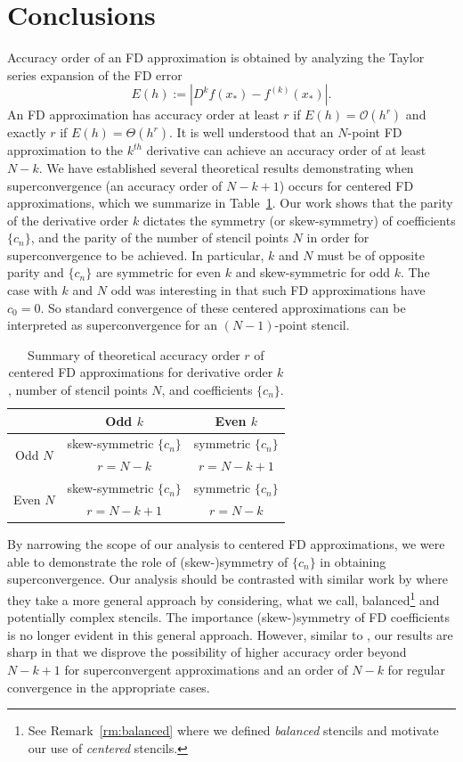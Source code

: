 \documentclass[12pt]{article}
\newcommand{\xstar}{x_*}
\newcommand{\FD}{D}
\begin{document}
\section{Conclusions}
\label{sec:conclusions}

Accuracy order of an FD approximation is obtained by analyzing the Taylor series expansion of the FD error
\[
	E(h) := \left| \FD^{k}f(\xstar) - f^{(k)}(\xstar)\right|.
\]
An FD approximation has accuracy order at least $r$ if $E(h)=\mathcal O(h^r)$ and exactly $r$ if $E(h)=\Theta(h^r)$.
It is well understood that an $N$-point FD approximation to the $k^{th}$ derivative can achieve an accuracy order of at least $N-k$.
We have established several theoretical results demonstrating when superconvergence (an accuracy order of $N-k+1$) occurs for centered FD approximations, which we summarize in Table~\ref{table:theory}.
Our work shows that the parity of the derivative order $k$ dictates the symmetry (or skew-symmetry) of coefficients $\{c_n\}$, and the parity of the number of stencil points $N$ in order for superconvergence to be achieved.
In particular, $k$ and $N$ must be of opposite parity and $\{c_n\}$ are symmetric for even $k$ and skew-symmetric for odd $k$.
The case with $k$ and $N$ odd was interesting in that such FD approximations have $c_0=0$.
So standard convergence of these centered approximations can be interpreted as superconvergence for an $(N-1)$-point stencil.

%
\begin{table}[h!]
\centering
\begin{tabular}{c|| c | c }
	& Odd $k$ & Even $k$ \\ \hline \hline
\multirow{2}{*}{Odd $N$} & skew-symmetric $\{c_n\}$ & symmetric $\{c_n\}$\\
	& $r=N-k$ & $r=N-k+1$ \\ \hline
\multirow{2}{*}{Even $N$} & skew-symmetric $\{c_n\}$ & symmetric $\{c_n\}$\\
	& $r = N-k+1$ & $r=N-k$ 
\end{tabular}
\caption{Summary of theoretical accuracy order $r$ of centered FD approximations for derivative order $k$, number of stencil points $N$, and coefficients $\{c_n\}$.}
\label{table:theory}
\end{table}

By narrowing the scope of our analysis to centered FD approximations, we were able to demonstrate the role of (skew-)symmetry of $\{c_n\}$ in obtaining superconvergence.
Our analysis should be contrasted with similar work by \cite{sadiq2014} where they take a more general approach by considering, what we call, balanced\footnote{See Remark~\ref{rm:balanced} where we defined \textit{balanced} stencils and motivate our use of \textit{centered} stencils.} and potentially complex stencils.
The importance (skew-)symmetry of FD coefficients is no longer evident in this general approach.
However, similar to \cite{sadiq2014}, our results are sharp in that we disprove the possibility of higher accuracy order beyond $N-k+1$ for superconvergent approximations and an order of $N-k$ for regular convergence in the appropriate cases.
\end{document}
